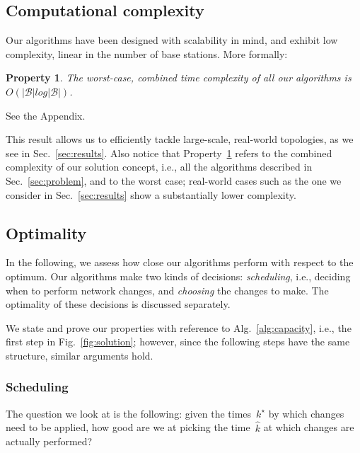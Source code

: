 \documentclass[10pt,journal,cspaper,compsoc]{IEEEtran}
\newcommand{\Fig}[1]{Fig.~\ref{fig:#1}}
\newcommand{\Sec}[1]{Sec.~\ref{sec:#1}}
\newcommand{\Alg}[1]{Alg.~\ref{alg:#1}}
\newtheorem{property}{Property}
\newcommand{\Prop}[1]{Property~\ref{prop:#1}}
\newcommand{\Bc}{\mathcal{B}}
\begin{document}
\subsection{Computational complexity}

Our algorithms have been designed with scalability in mind, and exhibit low complexity, linear in the number
of base stations. More formally:
\begin{property}
\label{prop:complexity}
The worst-case, {\em combined} time complexity of all our algorithms is~$O(|\Bc|log|\Bc|)$.
\end{property}
\begin{IEEEproof}
See the Appendix.
\end{IEEEproof}
This result allows us to efficiently tackle large-scale, real-world topologies, as we see in \Sec{results}.
Also notice that \Prop{complexity} refers to the combined complexity of our solution concept, i.e.,
all the algorithms described in \Sec{problem}, and to the worst case;
real-world cases such as the one we consider in \Sec{results} show a substantially lower complexity.

\subsection{Optimality}

In the following, we assess how close our algorithms perform with respect to the optimum. 
Our algorithms make two kinds of decisions: {\em scheduling}, i.e., deciding when to perform network changes, and
{\em choosing} the changes to make. The optimality of these decisions is discussed separately.

We state and prove our properties with reference to \Alg{capacity},
i.e., the first step in \Fig{solution}; however, since the following steps have the same structure, similar arguments hold.

\subsubsection{Scheduling}

The question we look at is the following: given the times~$k^\star$ by which changes need to be applied,
how good are we at picking the time~$\hat{k}$ at which changes are actually performed?
\end{document}
